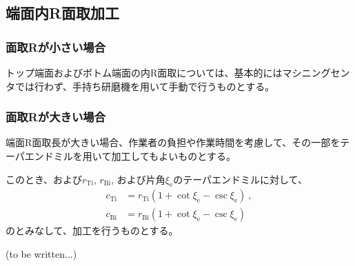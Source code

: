 \subsection{端面内R面取加工}

\subsubsection{面取Rが小さい場合}
トップ端面およびボトム端面の内R面取については、基本的にはマシニングセンタでは行わず、手持ち研磨機を用いて手動で行うものとする。

\subsubsection{面取Rが大きい場合}
端面R面取長が大きい場合、作業者の負担や作業時間を考慮して、その一部をテーパエンドミルを用いて加工してもよいものとする。

このとき、\TopEndFaceInRoundChamferRadius および\BottomFaceInRoundChamferRadius$r_\mathrm{Ti}$, $r_\mathrm{Bi}$, および片角$\xi_\mathrm e$のテーパエンドミルに対して、
\begin{align*}
  c_\mathrm{Ti} &= r_\mathrm{Ti}\left(1+\cot\xi_\mathrm e-\csc\xi_\mathrm e\right)\ ,\\
  c_\mathrm{Bi} &= r_\mathrm{Bi}\left(1+\cot\xi_\mathrm e-\csc\xi_\mathrm e\right)
\end{align*}
の\EndFaceChamferLength とみなして、\nameEndFaceInChamfer 加工を行うものとする。



\clearpage
(to be written...)


